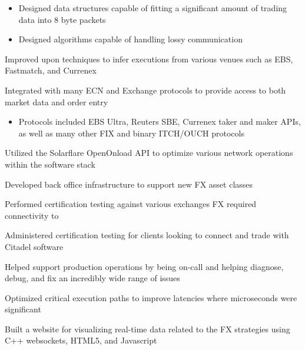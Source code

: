 \documentclass{report}
\begin{document}
\begin{table}
\begin{tabular}
{\begin{itemize}
                                          frames conforming to the SPS protocol
                                    \item Designed data structures capable of fitting a significant
                                          amount of trading data into 8 byte packets
                                    \item Designed algorithms capable of handling lossy
                                          communication
                               \end{itemize}
                         \item Improved upon techniques to infer executions from various venues such
                               as EBS, Fastmatch, and Currenex
                         \item Integrated with many ECN and Exchange protocols to provide access to
                               both market data and order entry
                               \begin{itemize}
                                 \item Protocols included EBS Ultra, Reuters SBE, Currenex taker and
                                       maker APIs, as well as many other FIX and binary ITCH/OUCH
                                       protocols
                               \end{itemize}
                         \item Utilized the Solarflare OpenOnload API to optimize various network
                               operations within the software stack
                         \item Developed back office infrastructure to support new FX asset classes
                         \item Performed certification testing against various exchanges FX required
                               connectivity to
                         \item Administered certification testing for clients looking to connect
                               and trade with Citadel software
                         \item Helped support production operations by being on-call and helping
                               diagnose, debug, and fix an incredibly wide range of issues
                         \item Optimized critical execution paths to improve latencies where
                               microseconds were significant
                         \item Built a website for visualizing real-time data related to the
                               FX strategies using C++ websockets, HTML5, and Javascript
                       } \\


\end{tabular}
\end{table}
\end{document}
